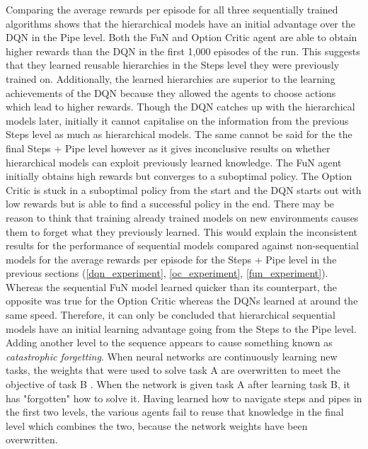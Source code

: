 \documentclass[notitlepage,a4paper,11pt]{article}
\begin{document}
Comparing the average rewards per episode for all three sequentially trained algorithms shows that the hierarchical models have an initial advantage over the DQN in the Pipe level. Both the FuN and Option Critic agent are able to obtain higher rewards than the DQN in the first 1,000 episodes of the run. This suggests that they learned reusable hierarchies in the Steps level they were previously trained on. Additionally, the learned hierarchies are superior to the learning achievements of the DQN because they allowed the agents to choose actions which lead to higher rewards. Though the DQN catches up with the hierarchical models later, initially it cannot capitalise on the information from the previous Steps level as much as hierarchical models. The same cannot be said for the the final Steps + Pipe level however as it gives inconclusive results on whether hierarchical models can exploit previously learned knowledge. The FuN agent initially obtains high rewards but converges to a suboptimal policy. The Option Critic is stuck in a suboptimal policy from the start and the DQN starts out with low rewards but is able to find a successful policy in the end. There may be reason to think that training already trained models on new environments causes them to forget what they previously learned. This would explain the inconsistent results for the performance of sequential models compared against non-sequential models for the average rewards per episode for the Steps + Pipe level in the previous sections (\ref{dqn_experiment}, \ref{oc_experiment}, \ref{fun_experiment}). Whereas the sequential FuN model learned quicker than its counterpart, the opposite was true for the Option Critic whereas the DQNs learned at around the same speed. Therefore, it can only be concluded that hierarchical sequential models have an initial learning advantage going from the Steps to the Pipe level. Adding another level to the sequence appears to cause something known as \textit{catastrophic forgetting}. When neural networks are continuously learning new tasks, the weights that were used to solve task A are overwritten to meet the objective of task B \cite{kirkpatrick2017overcoming}. When the network is given task A after learning task B, it has "forgotten" how to solve it. Having learned how to navigate steps and pipes in the first two levels, the various agents fail to reuse that knowledge in the final level which combines the two, because the network weights have been overwritten.
\end{document}
